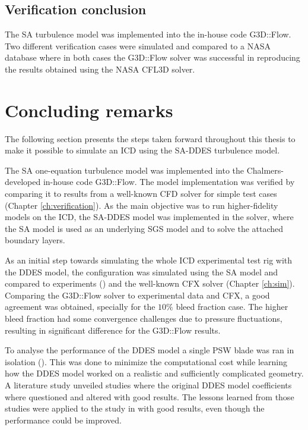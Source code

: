 \section{Verification conclusion}
The SA turbulence model was implemented into the in-house code G3D::Flow. Two different verification cases were simulated and compared to a NASA \cite{NASA} database where in both cases the G3D::Flow solver was successful in reproducing the results obtained using the NASA CFL3D solver.
%           

\chapter{Concluding remarks\label{ch:conclusion}}
The following section presents the steps taken forward throughout this thesis to make it possible to simulate an ICD using the SA-DDES turbulence model.

The SA one-equation turbulence model was implemented into the Chalmers-developed in-house code G3D::Flow. The model implementation was verified by comparing it to results from a well-known CFD solver for simple test cases (Chapter \ref{ch:verification}). As the main objective was to run higher-fidelity models on the ICD, the SA-DDES model was implemented in the solver, where the SA model is used as an underlying SGS model and to solve the attached boundary layers.

As an initial step towards simulating the whole ICD experimental test rig with the DDES model, the configuration was simulated using the SA model and compared to experiments () and the well-known CFX solver (Chapter \ref{ch:sim}). Comparing the G3D::Flow solver to experimental data and CFX, a good agreement was obtained, specially for the $10\%$ bleed fraction case. The higher bleed fraction had some convergence challenges due to pressure fluctuations, resulting in significant difference for the G3D::Flow results.

To analyse the performance of the DDES model a single PSW blade was ran in isolation (). This was done to minimize the computational cost while learning how the DDES model worked on a realistic and sufficiently complicated geometry. A literature study unveiled studies where the original DDES model coefficients where questioned and altered with good results. The lessons learned from those studies were applied to the study in  with good results, even though the performance could be improved.

